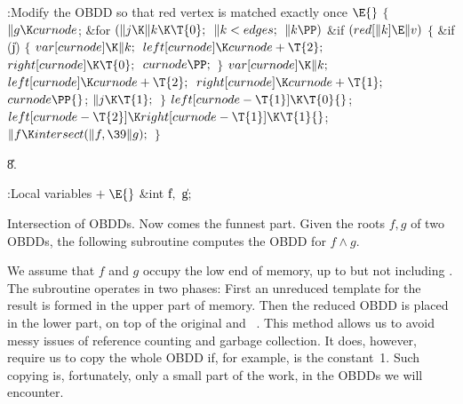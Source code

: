 \Y\B\4:Modify the OBDD so that red vertex  is matched exactly once%
\X${}\E{}$\6
${}\{{}$\1\6
${}\|g\K\\{curnode}{}$;\6
\&{for} ${}(\|j\K\|k\K\T{0};{}$ ${}\|k<\\{edges};{}$ ${}\|k\PP){}$\1\6
\&{if} ${}(\\{red}[\|k]\E\|v){}$\5
${}\{{}$\1\6
\&{if} (\|j)\5
${}\{{}$\1\6
${}\\{var}[\\{curnode}]\K\|k;{}$\6
${}\\{left}[\\{curnode}]\K\\{curnode}+\T{2};{}$\6
${}\\{right}[\\{curnode}]\K\T{0};{}$\6
${}\\{curnode}\PP;{}$\6
\4${}\}{}$\2\6
${}\\{var}[\\{curnode}]\K\|k;{}$\6
${}\\{left}[\\{curnode}]\K\\{curnode}+\T{2};{}$\6
${}\\{right}[\\{curnode}]\K\\{curnode}+\T{1};{}$\6
${}\\{curnode}\PP{}$;\6
${}\|j\K\T{1};{}$\6
\4${}\}{}$\2\2\6
${}\\{left}[\\{curnode}-\T{1}]\K\T{0}{}$;\6
${}\\{left}[\\{curnode}-\T{2}]\K\\{right}[\\{curnode}-\T{1}]\K\T{1}{}$;\6
${}\|f\K\\{intersect}(\|f,\39\|g);{}$\6
\4${}\}{}$\2\par
\U8.\fi

\B{}:Local variables\X${}\mathrel+\E{}$\6
\&{int} \|f${},{}$ \|g;\par
\fi

Intersection of OBDDs. Now comes the funnest part. Given
the roots $f,g$ of
two OBDDs, the following subroutine computes the OBDD for $f\land g$.

We assume that $f$ and $g$ occupy the low end of memory, up to but not
including . The subroutine operates in two phases: First an
unreduced
template for the result is formed in the upper part of memory. Then the
reduced OBDD is placed in the lower part, on top of the original  and~%
.
This method allows us to avoid messy issues of reference counting and garbage
collection. It does, however, require us to copy the whole OBDD if, for
example,  is the constant~1. Such copying is, fortunately, only a small
part of the work, in the OBDDs we will encounter.

